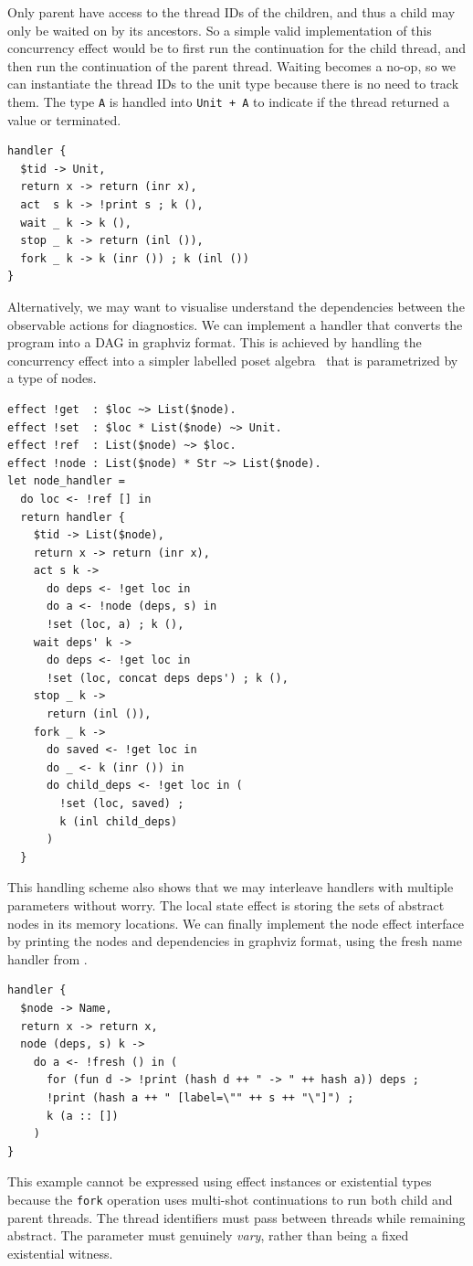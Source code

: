 \documentclass[acmsmall,screen,review,anonymous]{acmart}
\begin{document}
Only parent have access to the thread IDs of the children, and thus a child may only be waited on by its ancestors.
So a simple valid implementation of this concurrency effect would be to first run the continuation for the child thread, and then run the continuation of the parent thread.
Waiting becomes a no-op, so we can instantiate the thread IDs to the unit type because there is no need to track them.
The type \lstinline|A| is handled into \lstinline|Unit + A| to indicate if the thread returned a value or terminated.
\begin{lstlisting}
handler {
  $tid -> Unit,
  return x -> return (inr x),
  act  s k -> !print s ; k (),
  wait _ k -> k (),
  stop _ k -> return (inl ()),
  fork _ k -> k (inr ()) ; k (inl ())
}
\end{lstlisting}
Alternatively, we may want to visualise understand the dependencies between the observable actions for diagnostics.
We can implement a handler that converts the program into a DAG in graphviz format.
This is achieved by handling the concurrency effect into a simpler labelled poset algebra~\cite{kammar_handlers_2013} that is parametrized by a type of nodes.
\begin{lstlisting}
effect !get  : $loc ~> List($node).
effect !set  : $loc * List($node) ~> Unit.
effect !ref  : List($node) ~> $loc.
effect !node : List($node) * Str ~> List($node).
let node_handler = 
  do loc <- !ref [] in
  return handler {
    $tid -> List($node),
    return x -> return (inr x),
    act s k ->
      do deps <- !get loc in
      do a <- !node (deps, s) in
      !set (loc, a) ; k (),
    wait deps' k ->
      do deps <- !get loc in
      !set (loc, concat deps deps') ; k (),
    stop _ k ->
      return (inl ()),
    fork _ k ->
      do saved <- !get loc in
      do _ <- k (inr ()) in
      do child_deps <- !get loc in (
        !set (loc, saved) ;
        k (inl child_deps)
      )
  }
\end{lstlisting}
This handling scheme also shows that we may interleave handlers with multiple parameters without worry.
The local state effect is storing the sets of abstract nodes in its memory locations.
We can finally implement the node effect interface by printing the nodes and dependencies in graphviz format, using the fresh name handler from .
\begin{lstlisting}
handler {
  $node -> Name,
  return x -> return x,
  node (deps, s) k ->
    do a <- !fresh () in (
      for (fun d -> !print (hash d ++ " -> " ++ hash a)) deps ;
      !print (hash a ++ " [label=\"" ++ s ++ "\"]") ;
      k (a :: [])
    )
}
\end{lstlisting}
This example cannot be expressed using effect instances or existential types because the \lstinline{fork} operation
uses multi-shot continuations to run both child and parent threads. The thread identifiers must pass between threads while remaining abstract.
The parameter must genuinely \emph{vary}, rather than being a fixed existential witness.
\end{document}
